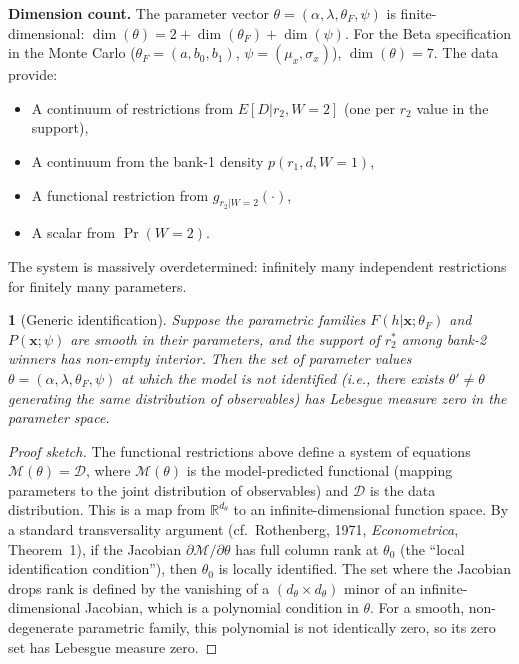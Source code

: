 \documentclass[12pt]{article}
\theoremstyle{plain}
\newtheorem{thm}{\protect\theoremname}
\theoremstyle{plain}
\theoremstyle{definition}  %
\theoremstyle{remark}  %
\providecommand{\theoremname}{Theorem}
\begin{document}
\medskip\noindent
\textbf{Dimension count.}  The parameter vector $\theta = (\alpha, \lambda, \theta_F, \psi)$ is finite-dimensional: $\dim(\theta) = 2 + \dim(\theta_F) + \dim(\psi)$.  For the Beta specification in the Monte Carlo ($\theta_F = (a, b_0, b_1)$, $\psi = (\mu_x, \sigma_x)$), $\dim(\theta) = 7$.  The data provide:
\begin{itemize}
    \item A continuum of restrictions from $E[D|r_2, W\!=\!2]$ (one per $r_2$ value in the support),
    \item A continuum from the bank-1 density $p(r_1, d, W\!=\!1)$,
    \item A functional restriction from $g_{r_2|W=2}(\cdot)$,
    \item A scalar from $\Pr(W\!=\!2)$.
\end{itemize}
The system is massively overdetermined: infinitely many independent restrictions for finitely many parameters.

\begin{thm}[Generic identification]\label{thm:generic_id}
Suppose the parametric families $F(h|\mathbf{x};\theta_F)$ and $P(\mathbf{x};\psi)$ are smooth in their parameters, and the support of $r_2^*$ among bank-2 winners has non-empty interior.  Then the set of parameter values $\theta = (\alpha, \lambda, \theta_F, \psi)$ at which the model is \emph{not} identified (i.e., there exists $\theta' \neq \theta$ generating the same distribution of observables) has Lebesgue measure zero in the parameter space.
\end{thm}

\begin{proof}[Proof sketch]
The functional restrictions above define a system of equations $\mathcal{M}(\theta) = \mathcal{D}$, where $\mathcal{M}(\theta)$ is the model-predicted functional (mapping parameters to the joint distribution of observables) and $\mathcal{D}$ is the data distribution.  This is a map from $\mathbb{R}^{d_\theta}$ to an infinite-dimensional function space.  By a standard transversality argument (cf.\ Rothenberg, 1971, \emph{Econometrica}, Theorem~1), if the Jacobian $\partial \mathcal{M}/\partial \theta$ has full column rank at $\theta_0$ (the ``local identification condition''), then $\theta_0$ is locally identified.  The set where the Jacobian drops rank is defined by the vanishing of a $(d_\theta \times d_\theta)$ minor of an infinite-dimensional Jacobian, which is a polynomial condition in $\theta$.  For a smooth, non-degenerate parametric family, this polynomial is not identically zero, so its zero set has Lebesgue measure zero.
\end{proof}
\end{document}
